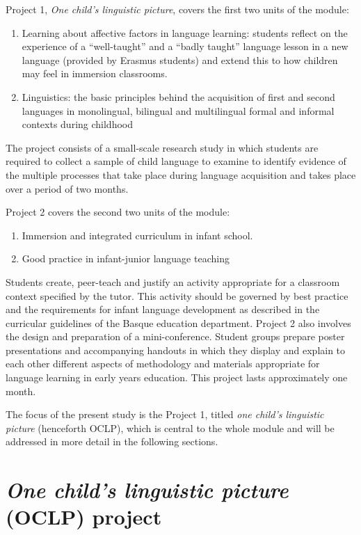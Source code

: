 \documentclass[output=paper]{../langscibook}
\begin{document}
Project 1, \emph{One child's linguistic picture}, covers the first two units of the module:

\begin{enumerate}
\item Learning about affective factors in language learning: students reflect on the experience of a “well-taught” and a “badly taught” language lesson in a new language (provided by Erasmus students) and extend this to how children may feel in immersion classrooms.
\item Linguistics: the basic principles behind the acquisition of first and second languages in monolingual, bilingual and multilingual formal and informal contexts during childhood 
\end{enumerate}

The project consists of a small-scale research study in which students are required to collect a sample of child language to examine to identify evidence of the multiple processes that take place during language acquisition and takes place over a period of two months.

Project 2 covers the second two units of the module: 

\begin{enumerate}[start=3]
\item Immersion and integrated curriculum in infant school. 
\item Good practice in infant-junior language teaching
\end{enumerate}

Students create, peer-teach and justify an activity appropriate for a classroom context specified by the tutor. This activity should be governed by best practice and the requirements for infant language development as described in the curricular guidelines of the Basque education department. Project 2 also involves the design and preparation of a mini-conference. Student groups prepare poster presentations and accompanying handouts in which they display and explain to each other different aspects of methodology and materials appropriate for language learning in early years education. This project lasts approximately one month.

The focus of the present study is the Project 1, titled \emph{one child's linguistic picture} (henceforth OCLP), which is central to the whole module and will be addressed in more detail in the following sections.


\section{\emph{One child's linguistic picture} (OCLP) project}
\end{document}
